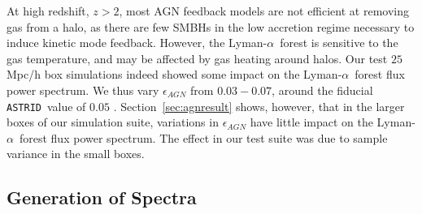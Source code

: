 \documentclass[a4paper,11pt]{article}
\newcommand{\Lya}{Lyman-$\alpha$}
\newcommand{\astrid}{\texttt{ASTRID}}
\begin{document}
At high redshift, $z > 2$, most AGN feedback models are not efficient at removing gas from a halo, as there are few SMBHs in the low accretion regime necessary to induce kinetic mode feedback.
However, the \Lya~forest is sensitive to the gas temperature, and may be affected by gas heating around halos. Our test $25$ Mpc/h box simulations indeed showed some impact on the \Lya~forest flux power spectrum. We thus vary $\epsilon_{AGN}$  from $0.03 - 0.07$, around the fiducial \astrid~value of $0.05$ \cite{Ni:2022}. Section~\ref{sec:agnresult} shows, however, that in the larger boxes of our simulation suite, variations in $\epsilon_{AGN}$ have little impact on the \Lya~forest flux power spectrum. The effect in our test suite was due to sample variance in the small boxes.


\subsection{Generation of Spectra}
\label{sec:spectra}
\end{document}
